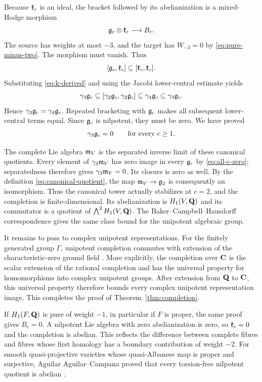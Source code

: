 Because $\mathfrak k_c$ is an ideal, the bracket followed by its abelianization
is a mixed-Hodge morphism
\[
 \mathfrak g_c\otimes\mathfrak k_c\longrightarrow B_c.
\]
The source has weights at most $-3$, and the target has $W_{-3}=0$ by
\eqref{eq:pure-minus-two}. The morphism must vanish. Thus
\begin{equation}\label{eq:action-zero}
 [\mathfrak g_c,\mathfrak k_c]\subseteq[\mathfrak k_c,\mathfrak k_c].
\end{equation}
Substituting \eqref{eq:k-derived} and using the Jacobi lower-central
estimate yields
\[
 \gamma_3\mathfrak g_c
 \subseteq[\gamma_2\mathfrak g_c,\gamma_2\mathfrak g_c]
 \subseteq\gamma_4\mathfrak g_c
 \subseteq\gamma_3\mathfrak g_c.
\]
Hence $\gamma_3\mathfrak g_c=\gamma_4\mathfrak g_c$. Repeated bracketing with $\mathfrak g_c$
makes all subsequent lower-central terms equal. Since $\mathfrak g_c$ is
nilpotent, they must be zero. We have proved
\begin{equation}\label{eq:all-c-zero}
 \gamma_3\mathfrak g_c=0\qquad\hbox{for every }c\geq1.
\end{equation}

The complete Lie algebra $\mathfrak m_V$ is the separated inverse limit of these
canonical quotients. Every element of $\gamma_3\mathfrak m_V$ has zero image in
every $\mathfrak g_c$ by \eqref{eq:all-c-zero}; separatedness therefore gives
$\gamma_3\mathfrak m_V=0$. Its closure is zero as well. By the definition
\eqref{eq:canonical-quotient}, the map $\mathfrak m_V\to\mathfrak g_2$ is consequently
an isomorphism. Thus the canonical tower actually stabilizes at $c=2$,
and the completion is finite-dimensional. Its abelianization is
$H_1(V,\mathbf Q)$ and its commutator is a quotient of
$\bigwedge^2H_1(V,\mathbf Q)$. The Baker--Campbell--Hausdorff correspondence
gives the same class bound for the unipotent algebraic group.

It remains to pass to complex unipotent representations. For the
finitely generated group $\Gamma$, unipotent completion commutes with
extension of the characteristic-zero ground field \cite[\S4]{Hain2015}. More explicitly, the completion over
$\mathbf C$ is the scalar extension of the rational completion and has the
universal property for homomorphisms into complex unipotent groups.
After extension from $\mathbf Q$ to $\mathbf C$, this universal property
therefore bounds every complex unipotent representation image. This
completes the proof of Theorem~\ref{thm:completion}.

\begin{remark}\label{rem:proper-fibre}
If $H_1(F,\mathbf Q)$ is pure of weight $-1$, in particular if $F$ is proper,
the same proof gives $B_c=0$. A nilpotent Lie algebra with zero
abelianization is zero, so $\mathfrak k_c=0$ and the completion is abelian.
This reflects the difference between complete fibres and fibres whose
first homology has a boundary contribution of weight $-2$. For smooth
quasi-projective varieties whose quasi-Albanese map is proper and
surjective, Aguilar Aguilar--Campana proved that every torsion-free
nilpotent quotient is abelian
\cite[arXiv version, Corollary 2(2)]{AguilarAguilarCampana2025}.
\end{remark}

